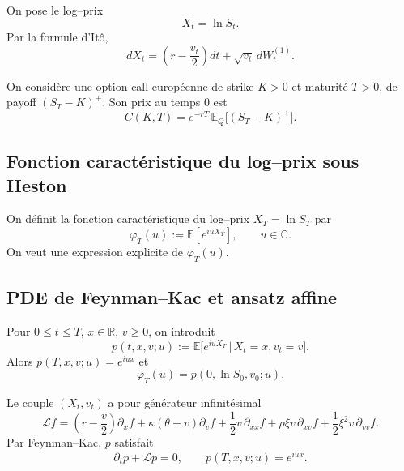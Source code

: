 \documentclass[11pt,a4paper]{article}
\newcommand{\1}{\mathbf{1}}
\begin{document}
On pose le log--prix
\begin{equation}
X_t = \ln S_t.
\end{equation}
Par la formule d'It\^o,
\begin{equation}
dX_t = \left(r - \frac{v_t}{2}\right)dt + \sqrt{v_t}\,dW^{(1)}_t.
\end{equation}

On consid\`ere une option call europ\'eenne de strike $K>0$ et maturit\'e $T>0$,
de payoff $(S_T-K)^+$. Son prix au temps $0$ est
\begin{equation}
C(K,T) = e^{-rT}\,\mathbb{E}_Q\big[(S_T - K)^+\big].
\end{equation}

\subsection{Fonction caract\'eristique du log--prix sous Heston}

On d\'efinit la fonction caract\'eristique du log--prix $X_T = \ln S_T$ par
\begin{equation}
\varphi_T(u) := \mathbb{E}\!\left[ e^{i u X_T} \right], \qquad u\in\mathbb{C}.
\end{equation}
On veut une expression explicite de $\varphi_T(u)$.

\subsection{PDE de Feynman--Kac et ansatz affine}

Pour $0\le t\le T$, $x\in\mathbb{R}$, $v\ge0$, on introduit
\begin{equation}
p(t,x,v;u) := \mathbb{E}\big[ e^{i u X_T} \,\big|\, X_t=x, v_t=v \big].
\end{equation}
Alors $p(T,x,v;u) = e^{iux}$ et
\begin{equation}
\varphi_T(u) = p(0,\ln S_0, v_0;u).
\end{equation}

Le couple $(X_t,v_t)$ a pour g\'en\'erateur infinit\'esimal
\begin{equation}
\mathcal{L} f =
\left(r - \frac{v}{2}\right)\partial_x f
+ \kappa(\theta - v)\partial_v f
+ \frac{1}{2} v\,\partial_{xx} f
+ \rho\xi v\,\partial_{xv} f
+ \frac{1}{2}\xi^2 v\,\partial_{vv} f.
\end{equation}
Par Feynman--Kac, $p$ satisfait
\begin{equation}
\partial_t p + \mathcal{L}p = 0, \qquad p(T,x,v;u) = e^{iux}.
\end{equation}
\end{document}
